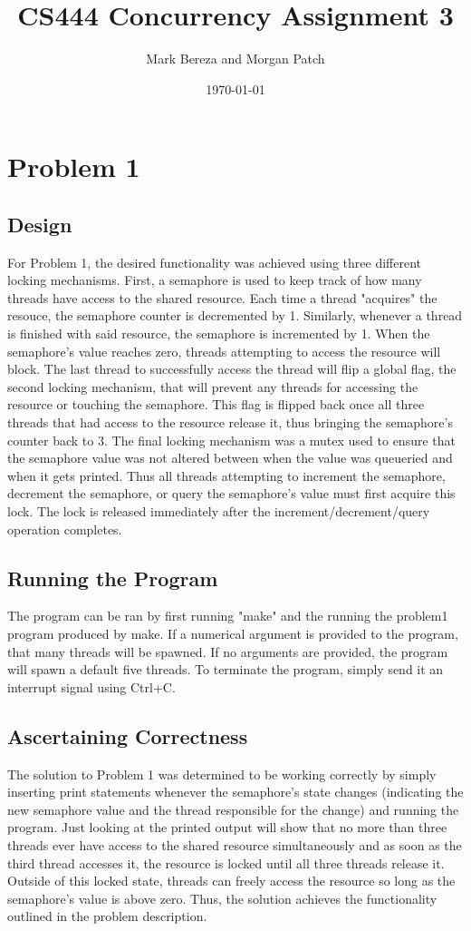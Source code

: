 \documentclass[onecolumn, draftclsnofoot,10pt, compsoc]{IEEEtran}
\begin{document}
\title{CS444 Concurrency Assignment 3}
\author{Mark Bereza and Morgan Patch}
\date{\today}
\maketitle
\section*{Problem 1}
\subsection*{Design}
For Problem 1, the desired functionality was achieved using three different locking mechanisms. First, a semaphore is used to keep track of how many threads have access to the shared resource. Each time a thread "acquires" the resouce, the semaphore counter is decremented by 1. Similarly, whenever a thread is finished with said resource, the semaphore is incremented by 1. When the semaphore's value reaches zero, threads attempting to access the resource will block. The last thread to successfully access the thread will flip a global flag, the second locking mechanism, that will prevent any threads for accessing the resource or touching the semaphore. This flag is flipped back once all three threads that had access to the resource release it, thus bringing the semaphore's counter back to 3. The final locking mechanism was a mutex used to ensure that the semaphore value was not altered between when the value was queueried and when it gets printed. Thus all threads attempting to increment the semaphore, decrement the semaphore, or query the semaphore's value must first acquire this lock. The lock is released immediately after the increment/decrement/query operation completes.

\subsection*{Running the Program}
The program can be ran by first running "make" and the running the problem1 program produced by make. If a numerical argument is provided to the program, that many threads will be spawned. If no arguments are provided, the program will spawn a default five threads. To terminate the program, simply send it an interrupt signal using Ctrl+C.

\subsection*{Ascertaining Correctness}
 The solution to Problem 1 was determined to be working correctly by simply inserting print statements whenever the semaphore's state changes (indicating the new semaphore value and the thread responsible for the change) and running the program. Just looking at the printed output will show that no more than three threads ever have access to the shared resource simultaneously and as soon as the third thread accesses it, the resource is locked until all three threads release it. Outside of this locked state, threads can freely access the resource so long as the semaphore's value is above zero. Thus, the solution achieves the functionality outlined in the problem description.
 
\end{document}
